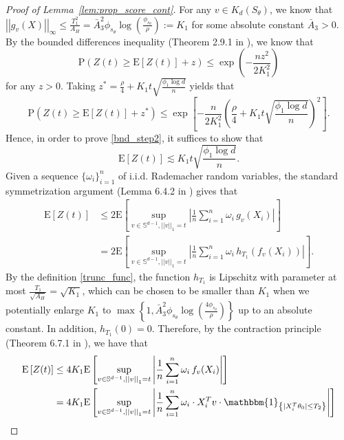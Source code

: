 \documentclass[ejsv2,noshowframe]{imsart}
\theoremstyle{plain}
\theoremstyle{definition}
\theoremstyle{remark}
\newcommand{\norm}[1]{\left|\left| #1 \right|\right|}
\begin{document}
\begin{proof}[Proof of Lemma~\ref{lem:prop_score_cont}]
	 For any $v\in K_d(S_{\theta})$, we know that $\norm{g_v(X)}_{\infty} \leq \frac{T_1^2}{A_H} =\bar{A}_3^2 \phi_{s_{\theta}} \log\left(\frac{\phi_{s_{\theta}}}{\rho}\right) := K_1$ for some absolute constant $\bar{A}_3>0$. By the bounded differences inequality (Theorem 2.9.1 in \citealt{vershynin2018high}), we know that
	$$\mathrm{P}\left(Z(t) \geq \mathrm{E}\left[Z(t)\right] + z \right) \leq \exp\left(-\frac{nz^2}{2K_1^2} \right)$$
	for any $z>0$. Taking $z^* = \frac{\rho}{4} + K_1 t \sqrt{\frac{\phi_1\log d}{n}}$ yields that
	$$\mathrm{P}\left(Z(t) \geq \mathrm{E}\left[Z(t)\right] + z^* \right) \leq \exp\left[-\frac{n}{2K_1^2} \left(\frac{\rho}{4} + K_1 t \sqrt{\frac{\phi_1\log d}{n}} \right)^2 \right].$$
	Hence, in order to prove \eqref{bnd_step2}, it suffices to show that
	\begin{equation}
		\label{Expect_Zt}
		\mathrm{E}\left[Z(t)\right] \lesssim K_1 t \sqrt{\frac{\phi_1\log d}{n}}.
	\end{equation}
	Given a sequence $\{\omega_i\}_{i=1}^n$ of i.i.d. Rademacher random variables, the standard symmetrization argument (Lemma 6.4.2 in \citealt{vershynin2018high}) gives that
	\begin{align*}
		\mathrm{E}\left[Z(t)\right] & \leq 2 \mathrm{E}\left[\sup_{v\in \mathbb{S}^{d-1},\norm{v}_1=t} \left|\frac{1}{n} \sum_{i=1}^n \omega_i\, g_v(X_i) \right| \right]\\
		&= 2 \mathrm{E}\left[\sup_{v\in \mathbb{S}^{d-1},\norm{v}_1=t} \left|\frac{1}{n} \sum_{i=1}^n \omega_i\, h_{T_1}\left(f_v(X_i)\right) \right| \right].
	\end{align*}
	By the definition \eqref{trunc_func}, the function $h_{T_1}$ is Lipschitz with parameter at most $\frac{T_1}{\sqrt{A_H}} = \sqrt{K_1}$, which can be chosen to be smaller than $K_1$ when we potentially enlarge $K_1$ to $\max\left\{1, \bar{A}_3^2\phi_{s_{\theta}} \log\left(\frac{4 \phi_{s_{\theta}}}{\rho}\right) \right\}$ up to an absolute constant. In addition, $h_{T_1}(0)=0$. Therefore, by the contraction principle (Theorem 6.7.1 in \citealt{vershynin2018high}), we have that
	\begin{align}
		\label{contraction_prin}
		\begin{split}
			\mathrm{E}\left[Z(t)\right] & \leq 4K_1 \mathrm{E}\left[\sup_{v\in \mathbb{S}^{d-1},\norm{v}_1=t} \left|\frac{1}{n} \sum_{i=1}^n \omega_i\, f_v(X_i) \right| \right]\\
			&= 4K_1 \mathrm{E}\left[\sup_{v\in \mathbb{S}^{d-1},\norm{v}_1=t} \left|\frac{1}{n} \sum_{i=1}^n \omega_i\cdot X_i^Tv \cdot \mathbbm{1}_{\left\{|X_i^T\theta_0| \leq T_2 \right\}} \right| \right]\\

\end{split}
\end{align}
\end{proof}
\end{document}
